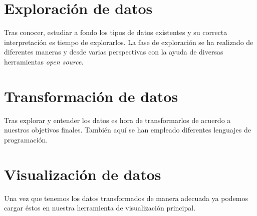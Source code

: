 \section{Exploración de datos}
Tras conocer, estudiar a fondo los tipos de datos existentes y su correcta interpretación es tiempo de explorarlos. La fase de exploración se ha realizado de diferentes maneras y desde varias perspectivas con la ayuda de diversas herramientas \textit{open source}.

\section{Transformación de datos}
Tras explorar y entender los datos es hora de transformarlos de acuerdo a nuestros objetivos finales. También aquí se han empleado diferentes lenguajes de programación.

\section{Visualización de datos}
Una vez que tenemos los datos transformados de manera adecuada ya podemos cargar éstos en nuestra herramienta de visualización principal.
